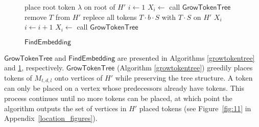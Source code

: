\documentclass[runningheads]{llncs}
\theoremstyle{plain}
\theoremstyle{definition}
\begin{document}
\begin{figure}[!t]
\begin{algorithm}[H]
    \caption{$\mathsf{FindEmbedding}$}
	\label{findEmbedding}
	\begin{algorithmic}[1]
    \STATE place root token $\lambda$ on root of $H'$
    \STATE $i \leftarrow 1$
    \STATE $X_i  \leftarrow$ call $\mathsf{GrowTokenTree}$
    \STATE remove $T$ from $H'$
    \STATE replece all tokens $T \cdot b \cdot S$ with $T \cdot S$ on $H'$
    \ENDIF
    \ELSE
    \RETURN $X_i$
    \ENDIF
    \STATE $i \leftarrow i+1$
    \STATE $X_i \leftarrow$ call $\mathsf{GrowTokenTree}$
    \ENDWHILE
	\end{algorithmic}
\end{algorithm}
\end{figure}


\begin{comment}
\ifthenelse{\boolean{Draft}}{
\begin{figure}[t]
    \centering
    \texttt{[image: pic11.eps]}
    \caption{Illustration of the operation of $\mathsf{GrowTokenTree}$. The orange tokens in $M_{t, d, l}$ indicate \textit{tokened} tokens. Starting from each left state and ending with each right state. $\mathsf{GrowTokenTree}$ places tokens of $M_{t, d, l}$ onto vertices of $H'$ while preserving the tree structure}
    \label{fig:11}
\end{figure}
}
\end{comment}



$\mathsf{GrowTokenTree}$ and $\mathsf{FindEmbedding}$ are presented in Algorithms \ref{growtokentree} and \ref{findEmbedding}, respectively. $\mathsf{GrowTokenTree}$ (Algorithm \ref{growtokentree}) greedily places tokens of $M_{t, d, l}$ onto vertices of $H'$ while preserving the tree structure. A token can only be placed on a vertex whose predecessors already have tokens. This process continues until no more tokens can be placed, at which point the algorithm outputs the set of vertices in $H'$ placed tokens (see Figure~\ref{fig:11} in Appendix~\ref{location_figures}).


\begin{comment}
\ifthenelse{\boolean{Draft}}{
\begin{figure}[t]
    \centering
    \texttt{[image: pic12.eps]}
    \caption{Illustration of token replacement in $\mathsf{FindEmbedding}$. A vertex $v$ satisfying the condition in line 5 of the pseudocode (Algorithm \ref{findEmbedding}) and the token $T$ placed at $v$ are selected ($M_{t, d, l}$ left, $H'$ left), and $T$ is removed from $v$. Subsequently, $T$'s all \textit{tokened} descendants $T\cdot b \cdot S$ ($1 \leq b \leq d$ and $S$ is a string of arbitrary length) are replaced with $T \cdot S$ on $H'$.}
    \label{fig:12}
\end{figure}
}
\end{comment}
\end{document}
